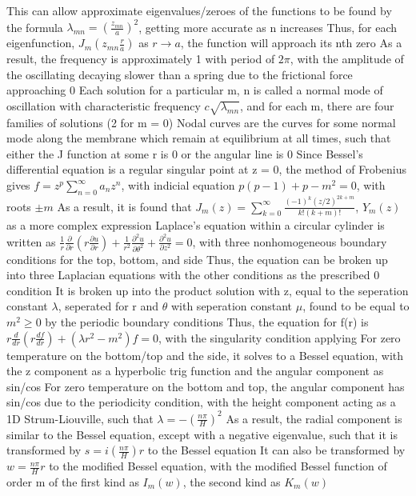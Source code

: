 \documentclass[11 pt, twoside]{article}
\newenvironment{outline*}
{
	\begin{outline}[enumerate]
	}
	{\end{outline}
}
\newcommand\pd[2]{\frac{\partial #1}{\partial #2}}
\begin{document}
\begin{outline*}
			\4 This can allow approximate eigenvalues/zeroes of the functions to be found by the formula $\lambda_{mn} = (\frac{z_{mn}}{a})^2$, getting more accurate as n increases
			\4 Thus, for each eigenfunction, $J_m(z_{mn}\frac{r}{a})$ as $r \to a$, the function will approach its nth zero
		\3 As a result, the frequency is approximately 1 with period of $2\pi$, with the amplitude of the oscillating decaying slower than a spring due to the frictional force approaching 0
	\2 Each solution for a particular m, n is called a normal mode of oscillation with characteristic frequency $c\sqrt{\lambda_{mn}}$, and for each m, there are four families of solutions (2 for m = 0)
		\3 Nodal curves are the curves for some normal mode along the membrane which remain at equilibrium at all times, such that either the J function at some r is 0 or the angular line is 0
	\2 Since Bessel's differential equation is a regular singular point at z = 0, the method of Frobenius gives $f = z^p \sum_{n = 0}^{\infty} a_n z^n$, with indicial equation $p(p - 1) + p - m^2 = 0$, with roots $\pm m$
		\3 As a result, it is found that $J_m(z) = \sum_{k = 0}^\infty \frac{(-1)^k (z/2)^{2k + m}}{k!(k + m)!}$, $Y_m(z)$ as a more complex expression
\1 Laplace's equation within a circular cylinder is written as $\frac{1}{r}\pd{}{r}(r\pd{u}{r}) + \frac{1}{r^2}\pd{^2u}{\theta^2} + \pd{^2u}{z^2} = 0$, with three nonhomogeneous boundary conditions for the top, bottom, and side
	\2 Thus, the equation can be broken up into three Laplacian equations with the other conditions as the prescribed 0 condition
	\2 It is broken up into the product solution with z, equal to the seperation constant $\lambda$, seperated for r and $\theta$ with seperation constant $\mu$, found to be equal to $m^2 \geq 0$ by the periodic boundary conditions
		\3 Thus, the equation for f(r) is $r\frac{d}{dr}(r\frac{df}{dr}) + (\lambda r^2 - m^2)f = 0$, with the singularity condition applying
	\2 For zero temperature on the bottom/top and the side, it solves to a Bessel equation, with the z component as a hyperbolic trig function and the angular component as sin/cos
	\2 For zero temperature on the bottom and top, the angular component has sin/cos due to the periodicity condition, with the height component acting as a 1D Strum-Liouville, such that $\lambda = -(\frac{n\pi}{H})^2$
		\3 As a result, the radial component is similar to the Bessel equation, except with a negative eigenvalue, such that it is transformed by $s = i(\frac{n\pi}{H})r$ to the Bessel equation
		\3 It can also be transformed by $w = \frac{n\pi}{H}r$ to the modified Bessel equation, with the modified Bessel function of order m of the first kind as $I_m(w)$, the second kind as $K_m(w)$

\end{outline*}
\end{document}

